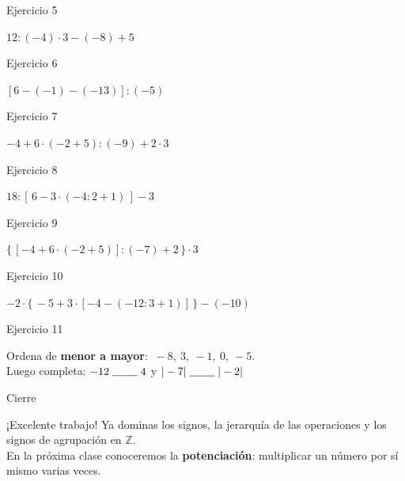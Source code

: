 \documentclass[aspectratio=169]{beamer}
\newcommand{\Z}{\mathbb{Z}}
\begin{document}
\begin{frame}{Ejercicio 5}
  \begin{mwejercicio}
    $12 : (-4) \cdot 3 - (-8) + 5$
  \end{mwejercicio}
\end{frame}

\begin{frame}{Ejercicio 6}
  \begin{mwejercicio}
    $[6 - (-1) - (-13)] : (-5)$
  \end{mwejercicio}
\end{frame}

\begin{frame}{Ejercicio 7}
  \begin{mwejercicio}
    $-4 + 6 \cdot (-2 + 5) : (-9) + 2 \cdot 3$
  \end{mwejercicio}
\end{frame}

\begin{frame}{Ejercicio 8}
  \begin{mwejercicio}
    $18 : [\,6 - 3 \cdot (-4 : 2 + 1)\,] - 3$
  \end{mwejercicio}
\end{frame}

\begin{frame}{Ejercicio 9}
  \begin{mwejercicio}
    $\{\,[-4 + 6 \cdot (-2 + 5)] : (-7) + 2\,\} \cdot 3$
  \end{mwejercicio}
\end{frame}

\begin{frame}{Ejercicio 10}
  \begin{mwejercicio}
    $-2 \cdot \{\,-5 + 3 \cdot [-4 - (-12 : 3 + 1)]\,\} - (-10)$
  \end{mwejercicio}
\end{frame}

\begin{frame}{Ejercicio 11}
  \begin{mwejercicio}
    Ordena de \textbf{menor a mayor}: $\ -8, \ 3, \ -1, \ 0, \ -5$.\\[8pt]
    Luego completa: $-12 \;\rule[-1pt]{0.8cm}{0.4pt}\; 4$ \qquad y \qquad $|-7| \;\rule[-1pt]{0.8cm}{0.4pt}\; |-2|$
  \end{mwejercicio}
\end{frame}

\begin{frame}{Cierre}
  \begin{exampleblock}{¡Excelente trabajo!}
    Ya dominas los signos, la jerarquía de las operaciones y los signos de agrupación en $\Z$.\\[6pt]
    En la próxima clase conoceremos la \textbf{potenciación}: multiplicar un número por sí mismo varias veces.
  \end{exampleblock}
\end{frame}
\end{document}
